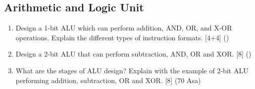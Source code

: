 \documentclass[12pt]{article}
\begin{document}
	\subsection{Arithmetic and Logic Unit}
	\begin{enumerate}[noitemsep, topsep = 0pt]
		\item Design a 1-bit ALU which can perform addition, AND, OR, and X-OR operations. Explain the different types of instruction formats. \hfill [4+4] ()
		
		\item Design a 2-bit ALU that can perform subtraction, AND, OR and XOR. \hfill [8] ()
		
		\item What are the stages of ALU design? Explain with the example of 2-bit ALU performing addition, subtraction, OR and XOR. \hfill [8] (70 Asa)
	\end{enumerate}
\end{document}
